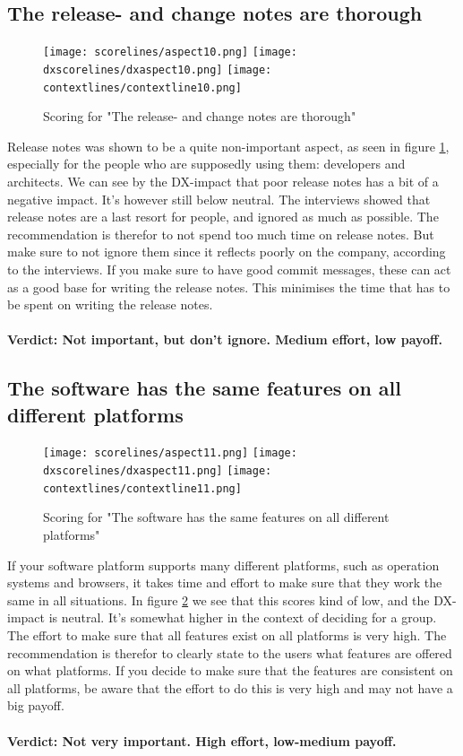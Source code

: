\documentclass{cslthse-msc}
\begin{document}
    \subsection{The release- and change notes are thorough}
    \begin{figure}[H]
        \centering
        \texttt{[image: scorelines/aspect10.png]}
        \texttt{[image: dxscorelines/dxaspect10.png]}
        \texttt{[image: contextlines/contextline10.png]}
        \caption{Scoring for "The release- and change notes are thorough"}
        \label{fig:aspect10}
    \end{figure}
    Release notes was shown to be a quite non-important aspect, as seen in figure \ref{fig:aspect10}, especially for the people who are supposedly using them: developers and architects. We can see by the DX-impact that poor release notes has a bit of a negative impact. It's however still below neutral. The interviews showed that release notes are a last resort for people, and ignored as much as possible. The recommendation is therefor to not spend too much time on release notes. But make sure to not ignore them since it reflects poorly on the company, according to the interviews. If you make sure to have good commit messages, these can act as a good base for writing the release notes. This minimises the time that has to be spent on writing the release notes.\\ \\
    \textbf{Verdict: Not important, but don't ignore. Medium effort, low payoff.}

    \subsection{The software has the same features on all different platforms}
    \begin{figure}[H]
        \centering
        \texttt{[image: scorelines/aspect11.png]}
        \texttt{[image: dxscorelines/dxaspect11.png]}
        \texttt{[image: contextlines/contextline11.png]}
        \caption{Scoring for "The software has the same features on all different platforms"}
        \label{fig:aspect11}
    \end{figure}
    If your software platform supports many different platforms, such as operation systems and browsers, it takes time and effort to make sure that they work the same in all situations. In figure \ref{fig:aspect11} we see that this scores kind of low, and the DX-impact is neutral. It's somewhat higher in the context of deciding for a group. The effort to make sure that all features exist on all platforms is very high. The recommendation is therefor to clearly state to the users what features are offered on what platforms. If you decide to make sure that the features are consistent on all platforms, be aware that the effort to do this is very high and may not have a big payoff. \\ \\
    \textbf{Verdict: Not very important. High effort, low-medium payoff.}
\end{document}
